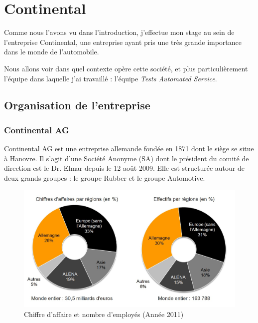 \chapter{Continental}\label{chapConti}
\begin{figure}
\vspace{-25px}
\hspace{-30px}
\begin{minipage}{0.67\textwidth}
\minitoc
\end{minipage}
\end{figure}
Comme nous l'avons vu dans l'introduction, j'effectue mon stage au sein de l'entreprise Continental, une entreprise ayant pris une très grande importance dans le monde de l'automobile. 

Nous allons voir dans quel contexte opère cette société, et plus particulièrement l'équipe dans laquelle j'ai travaillé : l'équipe \textit{Tests Automated Service}.
	\section{Organisation de l'entreprise}
		\subsection{Continental AG}

Continental AG est une entreprise allemande fondée en 1871 dont le siège se situe à Hanovre. Il s'agit d'une Société Anonyme (SA) dont le président du comité de
direction est le Dr. Elmar  depuis le 12 août 2009. Elle est structurée autour de deux grands groupes : le groupe Rubber et le groupe Automotive.
	 
		 \begin{figure}[H]
		 	\centering
		 	\includegraphics[width=12cm]{contents/images/caConti.jpg}
		 	\caption{Chiffre d'affaire et nombre d'employés (Année 2011)}
		 	\label{fig:caConti}
		 \end{figure}

